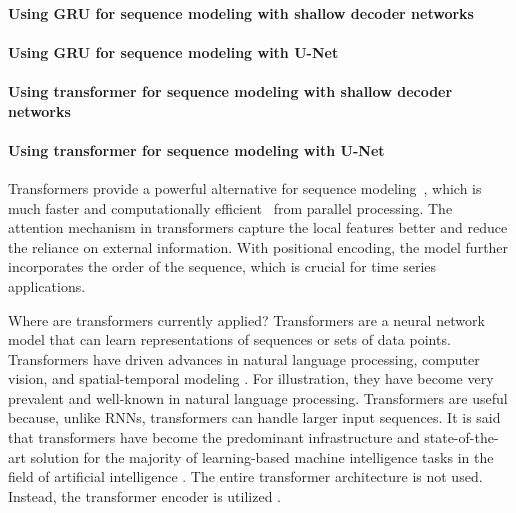 \documentclass[11pt, a4paper]{article}
\begin{document}
\paragraph{Using GRU for sequence modeling with shallow decoder networks}

\paragraph{Using GRU for sequence modeling with U-Net}

\paragraph{Using transformer for sequence modeling with shallow decoder networks}

\paragraph{Using transformer for sequence modeling with U-Net}

Transformers provide a powerful alternative for sequence modeling~\cite{elman1990finding,hochreiter1997long,schuster1997bidirectional,beck2024xlstm}, which is much faster and computationally efficient~\cite{vaswani2017attention} from parallel processing. 
% 
The attention mechanism in transformers capture the local features better and reduce the reliance on
external information. 
With positional encoding, the model further incorporates the order of the sequence, which is crucial for time series applications.


Where are transformers currently applied? Transformers are a neural network model that can learn
representations of sequences or sets of data points. Transformers have driven advances in natural language
processing, computer vision, and spatial-temporal modeling \cite{turner2024introductiontransformers}. For illustration, they have become very
prevalent and well-known in natural language processing. Transformers are useful because, unlike RNNs,
transformers can handle larger input sequences. It is said that transformers have become the predominant
infrastructure and state-of-the-art solution for the majority of learning-based machine intelligence tasks in
the field of artificial intelligence \cite{islam2023comprehensivesurveyapplicationstransformers}. The entire transformer architecture is not used. Instead, the transformer
encoder is utilized \cite{turner2024introductiontransformers}.
\end{document}
